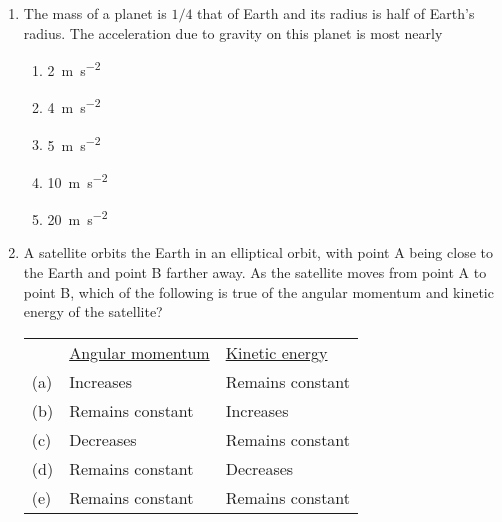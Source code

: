 \documentclass{../../../oss-apphys}
\begin{document}
\begin{multicols}{2}
\begin{enumerate}[leftmargin=18pt]
  \item The mass of a planet is $1/4$ that of Earth and its radius is half of
    Earth's radius. The acceleration due to gravity on this planet is most
    nearly
    \begin{enumerate}[noitemsep,topsep=0pt,leftmargin=18pt,label=(\Alph*)]
    \item\SI{2 }{\metre\per\second^2}
    \item\SI{4 }{\metre\per\second^2}
    \item\SI{5 }{\metre\per\second^2}
    \item\SI{10}{\metre\per\second^2}
    \item\SI{20}{\metre\per\second^2}
    \end{enumerate}
  
  \item A satellite orbits the Earth in an elliptical orbit, with point A being
    close to the Earth and point B farther away. As the satellite moves from
    point A to point B, which of the following is true of the angular momentum
    and kinetic energy of the satellite?
    \begin{center}
      \vspace{-.1in}
    \end{center}
  
    \begin{tabular}{lll}
      & \underline{Angular momentum} & \underline{Kinetic energy}\\
      (a) & Increases & Remains constant \\
      (b) & Remains constant & Increases \\
      (c) & Decreases & Remains constant \\
      (d) & Remains constant & Decreases \\
      (e) & Remains constant & Remains constant
    \end{tabular}

    \columnbreak
    

\end{enumerate}
\end{multicols}
\end{document}
